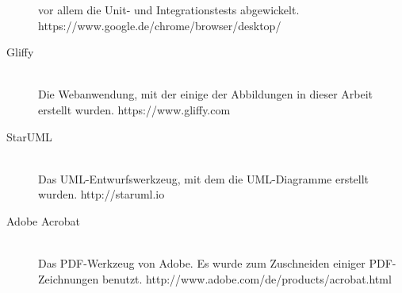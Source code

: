 \begin{description}
  vor allem die Unit- und Integrationstests abgewickelt.
  https://www.google.de/chrome/browser/desktop/
  \item[Gliffy] \hfill \\
  Die Webanwendung, mit der einige der Abbildungen in dieser Arbeit erstellt
  wurden. https://www.gliffy.com
  \item[StarUML] \hfill \\
  Das UML-Entwurfswerkzeug, mit dem die UML-Diagramme erstellt wurden.
  http://staruml.io
  \item[Adobe Acrobat] \hfill \\
  Das PDF-Werkzeug von Adobe. Es wurde zum Zuschneiden einiger PDF-Zeichnungen
  benutzt. http://www.adobe.com/de/products/acrobat.html
\end{description}

